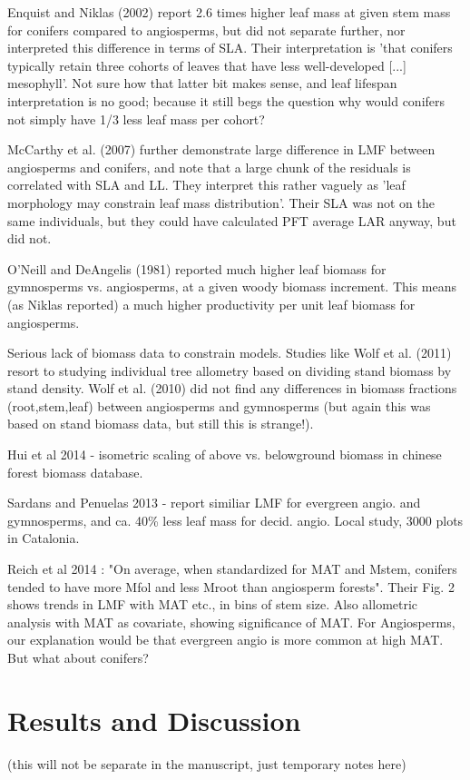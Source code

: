 \documentclass[a4paper]{article}
\begin{document}
Enquist and Niklas (2002) report 2.6 times higher leaf mass at given stem mass for conifers compared to angiosperms, but did not separate further, nor interpreted this difference in terms of SLA. Their interpretation is 'that conifers typically retain three cohorts of leaves that have less well-developed [...] mesophyll'. Not sure how that latter bit makes sense, and leaf lifespan interpretation is no good; because it still begs the question why would conifers not simply have 1/3 less leaf mass per cohort? 

McCarthy et al. (2007) further demonstrate large difference in LMF between angiosperms and conifers, and note that a large chunk of the residuals is correlated with SLA and LL. They interpret this rather vaguely as 'leaf morphology may constrain leaf mass distribution'. Their SLA was not on the same individuals, but they could have calculated PFT average LAR anyway, but did not.

O'Neill and DeAngelis (1981) reported much higher leaf biomass for gymnosperms vs. angiosperms, at a given woody biomass increment. This means (as Niklas reported) a much higher productivity per unit leaf biomass for angiosperms.

Serious lack of biomass data to constrain models. Studies like Wolf et al. (2011) resort to studying individual tree allometry based on dividing stand biomass by stand density. Wolf et al. (2010) did not find any differences in biomass fractions (root,stem,leaf) between angiosperms and gymnosperms (but again this was based on stand biomass data, but still this is strange!).

Hui et al 2014 - isometric scaling of above vs. belowground biomass in chinese forest biomass database.

Sardans and Penuelas 2013 - report similiar LMF for evergreen angio. and gymnosperms, and ca. 40\% less leaf mass for decid. angio. Local study, 3000 plots in Catalonia.

Reich et al 2014 : "On average, when standardized for MAT and Mstem, conifers tended to have more Mfol and less Mroot than angiosperm forests". Their Fig. 2 shows trends in LMF with MAT etc., in bins of stem size. Also allometric analysis with MAT as covariate, showing significance of MAT. For Angiosperms, our explanation would be that evergreen angio is more common at high MAT. But what about conifers?


\section{Results and Discussion}
(this will not be separate in the manuscript, just temporary notes here)
\end{document}
